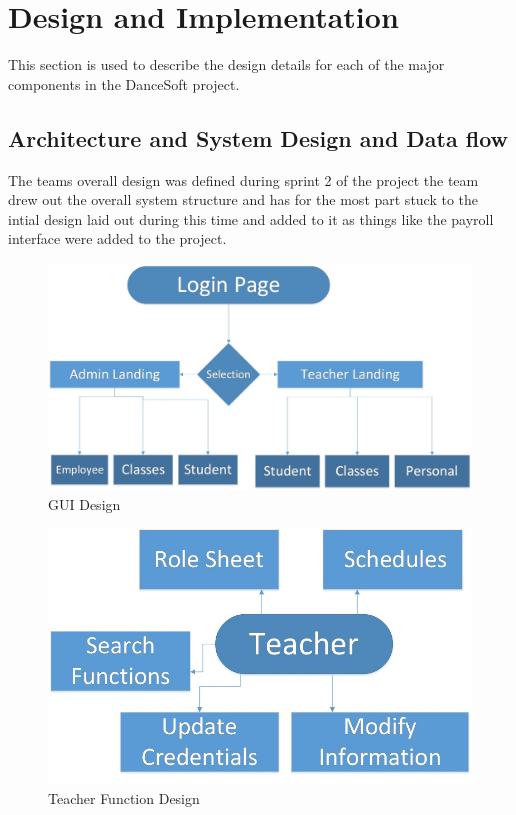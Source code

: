 
\chapter{Design  and Implementation}
This section is used to describe the design details for each of the major components 
in the DanceSoft project.
  
 
 \section{Architecture and System Design and Data flow }
 The teams overall design was defined during sprint 2 of the project the team drew out the overall system structure and has for the most part stuck to the intial design laid out during this time and added to it as things like the payroll interface were added to the project.
 
\begin{figure}
  \includegraphics[width=\linewidth]{pics/GUI_digram.jpg}
  \caption{GUI Design}
  \label{fig:GUI Design}
\end{figure}

\begin{figure}
  \includegraphics[width=\linewidth]{pics/TeacherFunctions.jpg}
  \caption{Teacher Function Design}
  \label{fig: Teacher Functions}
\end{figure}


